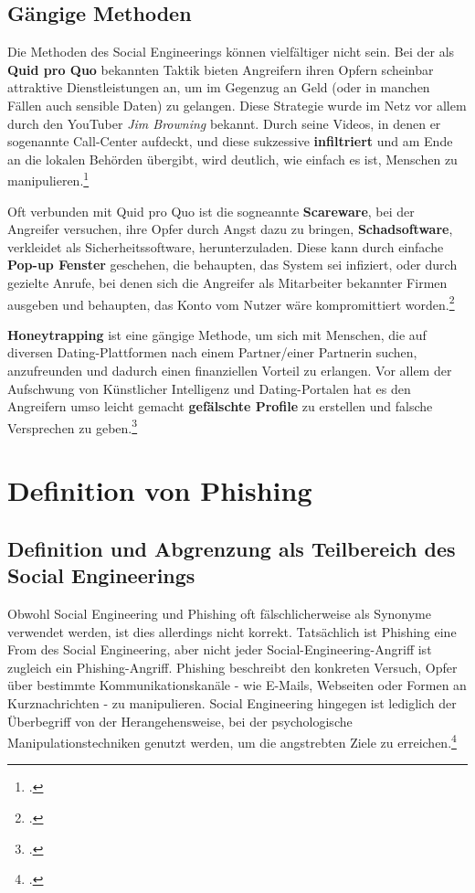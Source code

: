 \documentclass[12pt, a4paper, oneside]{scrartcl}
\begin{document}
\subsection{Gängige Methoden}
\par
Die Methoden des Social Engineerings können vielfältiger nicht sein.
Bei der als \textbf{Quid pro Quo} bekannten Taktik bieten Angreifern ihren Opfern scheinbar attraktive Dienstleistungen an, um im Gegenzug
an Geld (oder in manchen Fällen auch sensible Daten) zu gelangen. Diese Strategie wurde im Netz vor allem durch den YouTuber \textit{Jim Browning} bekannt.
Durch seine Videos, in denen er sogenannte Call-Center aufdeckt, und diese sukzessive \textbf{infiltriert} und
am Ende an die lokalen Behörden übergibt, wird deutlich, wie einfach es ist, Menschen zu manipulieren.\footcite{JB_YouTube}
\par
Oft verbunden mit Quid pro Quo ist die sogneannte \textbf{Scareware}, bei der Angreifer versuchen, ihre Opfer 
durch Angst dazu zu bringen, \textbf{Schadsoftware}, verkleidet als Sicherheitssoftware, herunterzuladen. Diese kann 
durch einfache \textbf{Pop-up Fenster} geschehen, die behaupten, das System sei infiziert, oder durch gezielte
Anrufe, bei denen sich die Angreifer als Mitarbeiter bekannter Firmen ausgeben und behaupten, das Konto
vom Nutzer wäre kompromittiert worden.\footcite{Keeper_Scareware}
\par
\textbf{Honeytrapping} ist eine gängige Methode, um sich mit Menschen, die auf diversen Dating-Plattformen nach
einem Partner/einer Partnerin suchen, anzufreunden und dadurch einen finanziellen Vorteil zu erlangen. Vor allem 
der Aufschwung von Künstlicher Intelligenz und Dating-Portalen hat es den Angreifern umso leicht gemacht
\textbf{gefälschte Profile} zu erstellen und falsche Versprechen zu geben.\footcite{CS_10Arten}\\

\section{Definition von Phishing}

\subsection{Definition und Abgrenzung als Teilbereich des Social Engineerings}
Obwohl Social Engineering und Phishing oft fälschlicherweise als Synonyme verwendet werden, ist dies allerdings nicht korrekt.
Tatsächlich ist Phishing eine From des Social Engineering, aber nicht jeder Social-Engineering-Angriff ist zugleich
ein Phishing-Angriff. 
Phishing beschreibt den konkreten Versuch, Opfer über bestimmte Kommunikationskanäle - wie E-Mails, Webseiten oder 
Formen an Kurznachrichten - zu manipulieren.
Social Engineering hingegen ist lediglich der Überbegriff von der Herangehensweise, bei der psychologische
Manipulationstechniken genutzt werden, um die angstrebten Ziele zu erreichen.\footcite{Keeper_Phishing}
\end{document}

